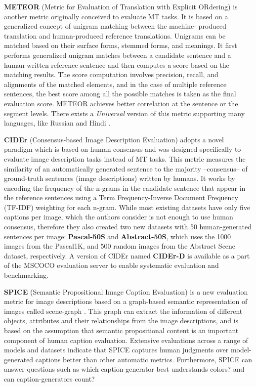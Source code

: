 \textbf{METEOR} (Metric for Evaluation of Translation with Explicit ORdering) \citep{Banerjee2005} is another metric originally conceived to evaluate MT tasks. It is based on a generalized concept of unigram matching between the machine- produced translation and human-produced reference translations. Unigrams can be matched based on their surface forms, stemmed forms, and meanings. It first performs generalized unigram matches between a candidate sentence and a human-written reference sentence and then computes a score based on the matching results. The score computation involves precision, recall, and alignments of the matched elements, and in the case of multiple reference sentences, the best score among all the possible matches is taken as the final evaluation score. METEOR achieves better correlation at the sentence or the segment levels. There exists a \textit{Universal} version of this metric supporting many languages, like Russian and Hindi \citet{Denkowski2014}.

\textbf{CIDEr} (Consensus-based Image Description Evaluation) \citep{Vedantam2015} adopts a novel paradigm which is based on human consensus and was designed specifically to evaluate image description tasks instead of MT tasks. This metric measures the similarity of an automatically generated sentence to the majority --consensus-- of ground-truth sentences (image descriptions) written by humans. It works by encoding the frequency of the n-grams in the candidate sentence that appear in the reference sentences using a Term Frequency-Inverse Document Frequency (TF-IDF) weighting for each n-gram. While most existing datasets have only five captions per image, which the authors consider is not enough to use human consensus, therefore they also created two new datasets with 50 human-generated sentences per image: \textbf{Pascal-50S} and \textbf{Abstract-50S}, which uses the 1000 images from the Pascal1K, and 500 random images from the Abstract Scene dataset, respectively. A version of CIDEr named \textbf{CIDEr-D} is available as a part of the MSCOCO evaluation server to enable systematic evaluation and benchmarking.

\textbf{SPICE} (Semantic Propositional Image Caption Evaluation) \citep{Anderson2016} is a new evaluation metric for image descriptions based on a graph-based semantic representation of images called scene-graph \citep{Johnson2015, Schuster2015}. This graph can extract the information of different objects, attributes and their relationships from the image descriptions, and is based on the assumption that semantic propositional content is an important component of human caption evaluation. Extensive evaluations across a range of models and datasets indicate that SPICE captures human judgments over model-generated captions better than other automatic metrics. Furthermore, SPICE can answer questions such as which caption-generator best understands colors? and can caption-generators count?

